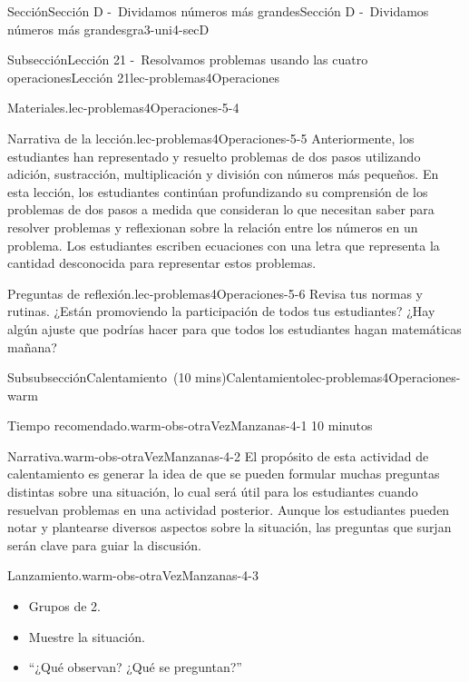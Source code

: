 \documentclass[oneside,10pt,]{article}
\begin{document}
\begin{sectionptx}{Sección}{Sección D -~Dividamos números más grandes}{}{Sección D -~Dividamos números más grandes}{}{}{gra3-uni4-secD}
\begin{subsectionptx}{Subsección}{Lección 21 -~Resolvamos problemas usando las cuatro operaciones}{}{Lección 21}{}{}{lec-problemas4Operaciones}
\begin{introduction}{}
\begin{paragraphs}{Materiales.}{lec-problemas4Operaciones-5-4}
\end{paragraphs}%
\begin{paragraphs}{Narrativa de la lección.}{lec-problemas4Operaciones-5-5}%
Anteriormente, los estudiantes han representado y resuelto problemas de dos pasos utilizando adición, sustracción, multiplicación y división con números más pequeños. En esta lección, los estudiantes continúan profundizando su comprensión de los problemas de dos pasos a medida que consideran lo que necesitan saber para resolver problemas y reflexionan sobre la relación entre los números en un problema. Los estudiantes escriben ecuaciones con una letra que representa la cantidad desconocida para representar estos problemas.%
\end{paragraphs}%
\begin{paragraphs}{Preguntas de reflexión.}{lec-problemas4Operaciones-5-6}%
Revisa tus normas y rutinas. ¿Están promoviendo la participación de todos tus estudiantes? ¿Hay algún ajuste que podrías hacer para que todos los estudiantes hagan matemáticas mañana?%
\end{paragraphs}%
\end{introduction}%
%
%
\typeout{************************************************}
\typeout{************************************************}
%
\begin{subsubsectionptx}{Subsubsección}{Calentamiento~(10 mins)}{}{Calentamiento}{}{}{lec-problemas4Operaciones-warm}
\par
\begin{paragraphs}{Tiempo recomendado.}{warm-obs-otraVezManzanas-4-1}%
10 minutos%
\end{paragraphs}%
\begin{paragraphs}{Narrativa.}{warm-obs-otraVezManzanas-4-2}%
El propósito de esta actividad de calentamiento es generar la idea de que se pueden formular muchas preguntas distintas sobre una situación, lo cual será útil para los estudiantes cuando resuelvan problemas en una actividad posterior. Aunque los estudiantes pueden notar y plantearse diversos aspectos sobre la situación, las preguntas que surjan serán clave para guiar la discusión.%
\end{paragraphs}%
\begin{paragraphs}{Lanzamiento.}{warm-obs-otraVezManzanas-4-3}%
%
\begin{itemize}[label=\textbullet]
\item{}Grupos de 2.%
\item{}Muestre la situación.%
\item{}``¿Qué observan? ¿Qué se preguntan?''%

\end{itemize}
\end{paragraphs}
\end{subsubsectionptx}
\end{subsectionptx}
\end{sectionptx}
\end{document}
